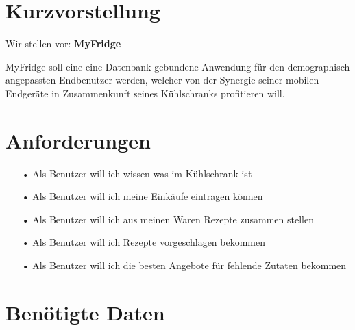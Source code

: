 \documentclass{article}
\begin{document}
\section{Kurzvorstellung}

\begin{center}
Wir stellen vor: \textbf{MyFridge}
\end{center}

\begin{flushleft}
MyFridge soll eine eine Datenbank gebundene Anwendung für den demographisch angepassten Endbenutzer werden, welcher von der Synergie seiner mobilen Endgeräte in Zusammenkunft seines Kühlschranks profitieren will.
\end{flushleft}

\section{Anforderungen}

\begin{itemize}
\item[•] Als Benutzer will ich wissen was im Kühlschrank ist
\item[•] Als Benutzer will ich meine Einkäufe eintragen können
\item[•] Als Benutzer will ich aus meinen Waren Rezepte zusammen stellen
\item[•] Als Benutzer will ich Rezepte vorgeschlagen bekommen
\item[•] Als Benutzer will ich die besten Angebote für fehlende Zutaten bekommen
\end{itemize}

\section{Benötigte Daten}
\end{document}
